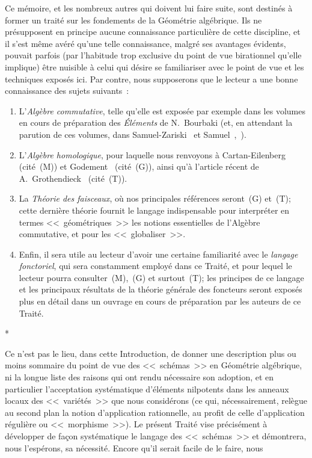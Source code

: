 
Ce mémoire, et les nombreux autres qui doivent lui faire suite, sont destinés à former un traité sur les fondements de la Géométrie algébrique.
Ils ne présupposent en principe aucune connaissance particulière de cette discipline, et il s'est même avéré qu'une telle connaissance, malgré ses avantages évidents, pouvait parfois (par l'habitude trop exclusive du point de vue birationnel qu'elle implique) être nuisible à celui qui désire se familiariser avec le point de vue et les techniques exposés ici.
Par contre, nous supposerons que le lecteur a une bonne connaissance des sujets suivants~:

\begin{enumerate}
  \item[a)] L'\emph{Algèbre commutative}, telle qu'elle est exposée par exemple dans les volumes en cours de préparation des \emph{Éléments} de N.~Bourbaki (et, en attendant la parution de ces volumes, dans Samuel-Zariski~\cite{I-13} et Samuel~\cite{I-11},~\cite{I-12}).
  \item[b)] L'\emph{Algèbre homologique}, pour laquelle nous renvoyons à Cartan-Eilenberg~\cite{I-2} (cité~(M)) et Godement~\cite{I-4} (cité~(G)), ainsi qu'à l'article récent de A.~Grothendieck~\cite{I-6} (cité~(T)).
  \item[c)] La \emph{Théorie des faisceaux}, où nos principales références seront~(G) et~(T); cette dernière théorie fournit le langage indispensable pour interpréter en termes <<~géométriques~>> les notions essentielles de l'Algèbre commutative, et pour les <<~globaliser~>>.
  \item[d)] Enfin, il sera utile au lecteur d'avoir une certaine familiarité avec le \emph{langage fonctoriel}, qui sera constamment employé dans ce Traité, et pour lequel le lecteur pourra consulter~(M),~(G) et surtout~(T); les principes de ce langage et les principaux résultats de la théorie générale des foncteurs seront exposés plus en détail dans un ouvrage en cours de préparation par les auteurs de ce Traité.
\end{enumerate}

\bigskip
\begin{center}*\quad*\quad*\end{center}
\bigskip

Ce n'est pas le lieu, dans cette Introduction, de donner une description plus ou moins sommaire du point de vue des <<~schémas~>> en Géométrie algébrique, ni la longue liste des raisons qui ont rendu nécessaire son adoption, et en particulier l'acceptation systématique d'éléments nilpotents dans les anneaux locaux des <<~variétés~>> que nous considérons (ce qui, nécessairement, relègue au second plan la notion d'application rationnelle, au profit de celle d'application régulière ou <<~morphisme~>>).
Le présent Traité vise précisément à développer de façon systématique le langage des <<~schémas~>> et démontrera, nous l'espérons, sa nécessité.
Encore qu'il serait facile de le faire, nous

